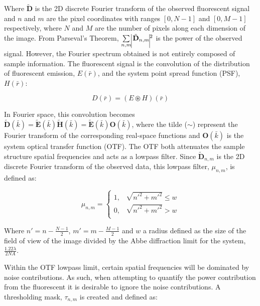 Where $\tilde{\textbf{D}}$ is the 2D discrete Fourier transform of 
the observed fluorescent signal and $n$ and $m$ are the pixel coordinates 
with ranges $[0, N-1]$ and $[0, M-1]$ respectively, where $N$ and $M$ are the
number of pixels along each dimension of the image. From Parseval's Theorem, 
$\sum\limits_{n,m}\vline \tilde{\textbf{D}}_{n,m} \vline^2$ is
the power of the observed signal. However, the Fourier spectrum
obtained is not entirely composed of sample information. The 
fluorescent signal is the convolution of the distribution of fluorescent 
emission, $E(\bar{r})$, and the system point spread function (PSF), 
$H(\bar{r})$: 

\begin{equation}\label{eq:fluor_signal_real}
D(\bar{r}) = (E \circledast H)(\bar{r})
\end{equation}

In Fourier space, this convolution becomes $\tilde{\textbf{D}}(\bar{k}) 
= \tilde{\textbf{E}}(\bar{k}) \tilde{\textbf{H}}(\bar{k}) = 
\tilde{\textbf{E}}(\bar{k}) \textbf{O}(\bar{k})$, where the tilde ($\sim$)
represent the Fourier transform of the corresponding real-space functions and 
$\textbf{O}(\bar{k})$ is the system optical transfer function (OTF).\cite{gustafsson2008three} The OTF both attenuates the sample structure spatial frequencies and acts as
a lowpass filter. Since $\tilde{\textbf{D}}_{n,m}$ is the 2D discrete
Fourier transform of the observed data, this lowpass filter, $\mu_{n,m}$, is
defined as:

\begin{equation}\label{eq:circular_mask}
\mu_{n,m} = 
\begin{cases}
1, & \sqrt{n'^{2} + m'^{2}} \le w\\
0, & \sqrt{n'^{2} + m'^{2}} > w\\ 
\end{cases}
\end{equation}

Where $n' = n - \frac{N-1}{2}$, $m' = m - \frac{M-1}{2}$ and $w$ a radius 
defined as the size of the field of view of the image divided by the Abbe
diffraction limit for the system, $\frac{1.22\lambda}{2NA}$.\cite{abbe1873beitrage} 

Within the OTF lowpass limit, certain spatial frequencies will be dominated
by noise contributions. As such, when attempting to quantify the power 
contribution from the fluorescent it is desirable to ignore the noise
contributions. A thresholding mask, $\tau_{n,m}$ is created and defined as:

